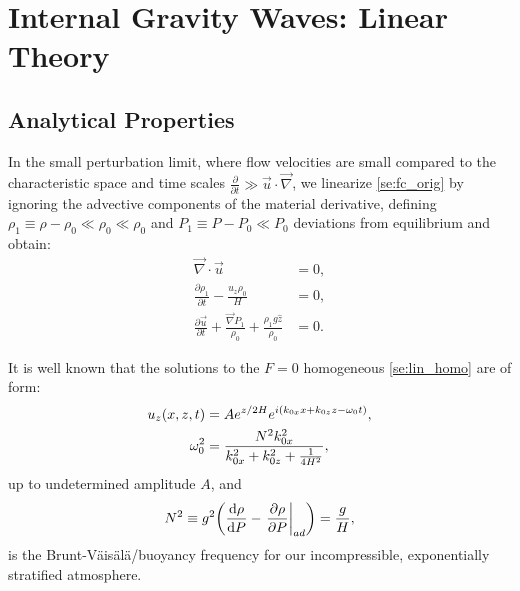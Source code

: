 \documentclass[twocolumn,
        nofootinbib, %
        usenames, %
        aps,
        prd,
        dvipsnames %
    ]{revtex4-1}%
\newcommand*{\rd}[2]{\frac{\mathrm{d}#1}{\mathrm{d}#2}}
\newcommand*{\pd}[2]{\frac{\partial#1}{\partial#2}}
\newcommand*{\at}[1]{\left.#1\right|}
\DeclarePairedDelimiter\p{\lparen}{\rparen}
\begin{document}
\section{Internal Gravity Waves: Linear Theory}

\subsection{Analytical Properties}

In the small perturbation limit, where flow velocities are small compared to the
characteristic space and time scales $\pd{}{t} \gg \vec{u} \cdot \vec{\nabla}$,
we linearize \autoref{se:fc_orig} by ignoring the advective components of the
material derivative, defining $\rho_1 \equiv \rho - \rho_0 \ll \rho_0 \ll
\rho_0$ and $P_1 \equiv P - P_0 \ll P_0$ deviations from equilibrium and obtain:
\begin{subequations}\label{se:lin_homo}
    \begin{align}
        \vec{\nabla} \cdot \vec{u} &= 0,\\
        \pd{\rho_1}{t} - \frac{u_{z} \rho_0}{H} &= 0,\\
        \pd{\vec{u}}{t} + \frac{\vec{\nabla}P_1}{\rho_0}
            + \frac{\rho_1 g\hat{z}}{\rho_0}
            &= 0.
    \end{align}
\end{subequations}

It is well known that the solutions to the $F = 0$ homogeneous
\autoref{se:lin_homo} are of form\cite{drazin,sutherland0}:
\begin{subequations}\label{se:lin_sol}
    \begin{align}
        u_z\p*{x, z, t} &= Ae^{z/2H}e^{i(k_{0x}x + k_{0z}z - \omega_0 t)},\\
        \omega_0^2 &= \frac{N^2k_{0x}^2}{k_{0x}^2 + k_{0z}^2 + \frac{1}{4H^2}},
    \end{align}
\end{subequations}
up to undetermined amplitude $A$, and
\begin{equation}
    N^2 \equiv g^2\p*{\rd{\rho}{P} - \at{\pd{\rho}{P}}_{ad}}
        = \frac{g}{H},
\end{equation}
is the Brunt-V\"ais\"al\"a/buoyancy frequency for our incompressible,
exponentially stratified atmosphere.
\end{document}
